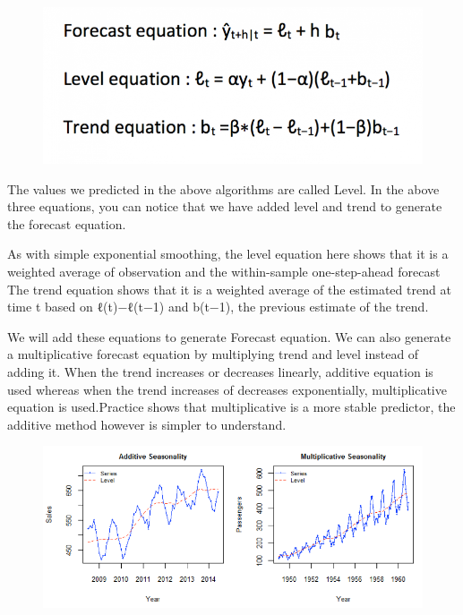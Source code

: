 \documentclass[11pt]{article}
\makeatletter
\def\maxwidth{\ifdim\Gin@nat@width>\linewidth\linewidth
    \else\Gin@nat@width\fi}
\let\Oldincludegraphics\includegraphics
\renewcommand{\includegraphics}[1]{\Oldincludegraphics[width=.8\maxwidth]{#1}}
\makeatother
\begin{document}
\begin{figure}
\centering
\includegraphics{image11.png}
\caption{}
\end{figure}

The values we predicted in the above algorithms are called Level. In the
above three equations, you can notice that we have added level and trend
to generate the forecast equation.

As with simple exponential smoothing, the level equation here shows that
it is a weighted average of observation and the within-sample
one-step-ahead forecast The trend equation shows that it is a weighted
average of the estimated trend at time t based on ℓ(t)−ℓ(t−1) and
b(t−1), the previous estimate of the trend.

We will add these equations to generate Forecast equation. We can also
generate a multiplicative forecast equation by multiplying trend and
level instead of adding it. When the trend increases or decreases
linearly, additive equation is used whereas when the trend increases of
decreases exponentially, multiplicative equation is used.Practice shows
that multiplicative is a more stable predictor, the additive method
however is simpler to understand.

\begin{figure}
\centering
\includegraphics{image12.png}
\caption{}
\end{figure}
\end{document}
